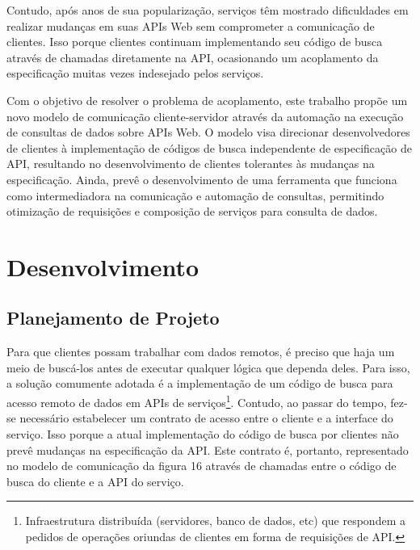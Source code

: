 \documentclass[12pt]{article}
\begin{document}
  Contudo, após anos de sua popularização, serviços têm mostrado dificuldades em realizar mudanças em suas APIs Web sem comprometer a comunicação de clientes. Isso porque clientes continuam implementando seu código de busca através de chamadas diretamente na API, ocasionando um acoplamento da especificação muitas vezes indesejado pelos serviços.

  Com o objetivo de resolver o problema de acoplamento, este trabalho propõe um novo modelo de comunicação cliente-servidor através da automação na execução de consultas de dados sobre APIs Web. O modelo visa direcionar desenvolvedores de clientes à implementação de códigos de busca independente de especificação de API, resultando no desenvolvimento de clientes tolerantes às mudanças na especificação. Ainda, prevê o desenvolvimento de uma ferramenta que funciona como intermediadora na comunicação e automação de consultas, permitindo otimização de requisições e composição de serviços para consulta de dados.

  \section{Desenvolvimento}

  \subsection{Planejamento de Projeto}

  Para que clientes possam trabalhar com dados remotos, é preciso que haja um meio de buscá-los antes de executar qualquer lógica que dependa deles. Para isso, a solução comumente adotada é a implementação de um código de busca para acesso remoto de dados em APIs de serviços\footnote{
    Infraestrutura distribuída (servidores, banco de dados, etc) que respondem a pedidos de operações oriundas de clientes em forma de requisições de API.
  }. Contudo, ao passar do tempo, fez-se necessário estabelecer um contrato de acesso entre o cliente e a interface do serviço. Isso porque a atual implementação do código de busca por clientes não prevê mudanças na especificação da API. Este contrato é, portanto, representado no modelo de comunicação da figura 16 através de chamadas entre o código de busca do cliente e a API do serviço.
\end{document}
